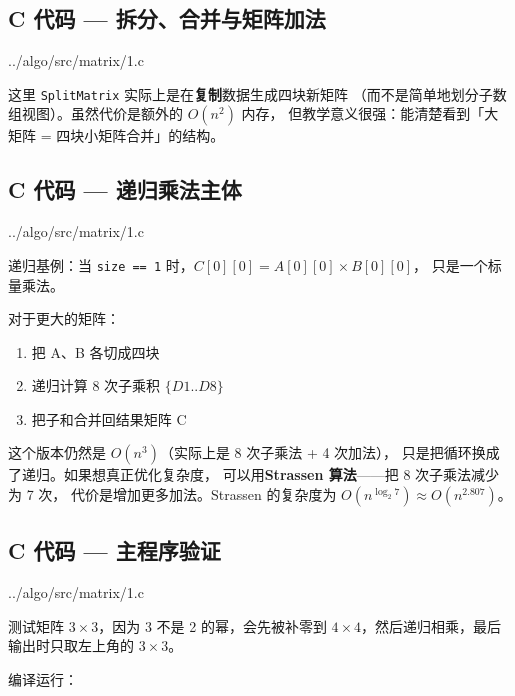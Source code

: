\subsection{C 代码 — 拆分、合并与矩阵加法}


{../algo/src/matrix/1.c}

这里 \texttt{SplitMatrix} 实际上是在\textbf{复制}数据生成四块新矩阵
（而不是简单地划分子数组视图）。虽然代价是额外的 \(O(n^2)\) 内存，
但教学意义很强：能清楚看到「大矩阵 = 四块小矩阵合并」的结构。

\subsection{C 代码 — 递归乘法主体}


{../algo/src/matrix/1.c}

递归基例：当 \texttt{size == 1} 时，\(C[0][0] = A[0][0] \times B[0][0]\)，
只是一个标量乘法。

对于更大的矩阵：

\begin{enumerate}
    \item 把 A、B 各切成四块
    \item 递归计算 8 次子乘积 \(\{D1..D8\}\)
    \item 把子和合并回结果矩阵 C
\end{enumerate}

这个版本仍然是 \(O(n^3)\)（实际上是 8 次子乘法 + 4 次加法），
只是把循环换成了递归。如果想真正优化复杂度，
可以用\textbf{Strassen 算法}——把 8 次子乘法减少为 7 次，
代价是增加更多加法。Strassen 的复杂度为 \(O(n^{\log_2 7}) \approx O(n^{2.807})\)。

\subsection{C 代码 — 主程序验证}


{../algo/src/matrix/1.c}

测试矩阵 \(3 \times 3\)，因为 3 不是 2 的幂，会先被补零到
\(4 \times 4\)，然后递归相乘，最后输出时只取左上角的 \(3 \times 3\)。

编译运行：

